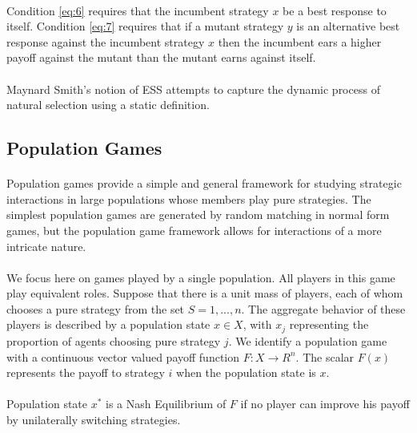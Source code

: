 \paragraph{}Condition \ref{eq:6} requires that the incumbent strategy $x$ be a best response to itself. Condition \ref{eq:7} requires that if a mutant strategy $y$ is an alternative best response against the incumbent strategy $x$ then the incumbent ears a higher payoff against the mutant than the mutant earns against itself.
\paragraph{}Maynard Smith's notion of ESS attempts to capture the dynamic process of natural selection using a static definition.

\subsection{Population Games}
\paragraph{}Population games provide a simple and general framework for studying strategic interactions in large populations whose members play pure strategies. The simplest population games are generated by random matching in normal form games, but the population game framework allows for interactions of a more intricate nature.
\paragraph{}We focus here on games played by a single population. All players in this game play equivalent roles. Suppose that there is a unit mass of players, each of whom chooses a pure strategy from the set
 $S = {1, ... , n}$. The aggregate behavior of these players is described by a population state $x \in X$, with $x_j$ representing the proportion of agents choosing pure strategy $j$. We identify a population game with a continuous vector valued payoff function $ F:X \rightarrow R^n$. The scalar $F(x)$ represents the payoff to strategy $i$ when the population state is $x$.
\paragraph{}Population state $x^*$ is a Nash Equilibrium of $F$ if no player can improve his payoff by unilaterally switching strategies.